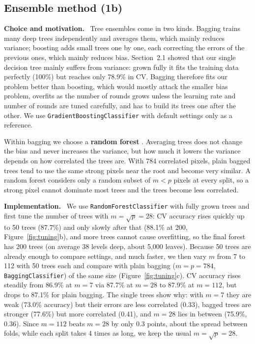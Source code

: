 \documentclass[11pt,a4paper]{article}
\newcommand{\pkg}[1]{\texttt{#1}}
\newcommand{\para}[1]{\textbf{#1}\ }
\begin{document}
\subsection{Ensemble method (1b)}
\label{sec:ensemble}
\para{Choice and motivation.} Tree ensembles come in two kinds. Bagging trains many deep trees independently and averages them, which mainly reduces variance; boosting adds small trees one by one, each correcting the errors of the previous ones, which mainly reduces bias. Section~2.1 showed that our single decision tree mainly suffers from variance: grown fully it fits the training data perfectly (100\%) but reaches only 78.9\% in CV. Bagging therefore fits our problem better than boosting, which would mostly attack the smaller bias problem, overfits as the number of rounds grows unless the learning rate and number of rounds are tuned carefully, and has to build its trees one after the other. We use \pkg{GradientBoostingClassifier} with default settings only as a reference.

Within bagging we choose a \textbf{random forest} \citep{breiman2001}. Averaging trees does not change the bias and never increases the variance, but how much it lowers the variance depends on how correlated the trees are. With 784 correlated pixels, plain bagged trees tend to use the same strong pixels near the root and become very similar. A random forest considers only a random subset of $m<p$ pixels at every split, so a strong pixel cannot dominate most trees and the trees become less correlated.

\para{Implementation.} We use \pkg{RandomForestClassifier} with fully grown trees and first tune the number of trees with $m=\sqrt{p}=28$: CV accuracy rises quickly up to 50 trees (87.7\%) and only slowly after that (88.1\% at 200, Figure~\ref{fig:tuning}b), and more trees cannot cause overfitting, so the final forest has 200 trees (on average 38 levels deep, about 5{,}000 leaves). Because 50 trees are already enough to compare settings, and much faster, we then vary $m$ from 7 to 112 with 50 trees each and compare with plain bagging ($m=p=784$, \pkg{BaggingClassifier}) of the same size (Figure~\ref{fig:tuning}c). CV accuracy rises steadily from 86.9\% at $m=7$ via 87.7\% at $m=28$ to 87.9\% at $m=112$, but drops to 87.1\% for plain bagging. The single trees show why: with $m=7$ they are weak (73.0\% accuracy) but their errors are less correlated (0.33), bagged trees are stronger (77.6\%) but more correlated (0.41), and $m=28$ lies in between (75.9\%, 0.36). Since $m=112$ beats $m=28$ by only 0.3 points, about the spread between folds, while each split takes 4 times as long, we keep the usual $m=\sqrt{p}=28$.
\end{document}
